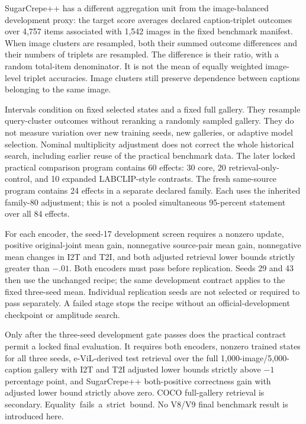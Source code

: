 \documentclass[11pt]{article}
\begin{document}
SugarCrepe++ has a different aggregation unit from the image-balanced
development proxy: the target score averages declared caption-triplet
outcomes over 4,757 items associated with 1,542 images in the fixed
benchmark manifest. When image clusters are resampled, both their summed outcome
differences and their numbers of triplets are resampled. The difference
is their ratio, with a random total-item denominator. It is not the mean
of equally weighted image-level triplet accuracies. Image clusters still
preserve dependence between captions belonging to the same image.

Intervals condition on fixed selected states and a fixed full gallery.
They resample query-cluster outcomes without reranking a randomly sampled
gallery. They do not measure variation over new training seeds, new
galleries, or adaptive model selection. Nominal multiplicity adjustment
does not correct the whole historical search, including earlier reuse of
the practical benchmark data. The later locked practical comparison
program contains 60 effects: 30 core, 20 retrieval-only-control, and 10
expanded LABCLIP-style contrasts. The fresh same-source program contains
24 effects in a separate declared family. Each uses the inherited
family-80 adjustment; this is not a pooled simultaneous 95-percent
statement over all 84 effects.

For each encoder, the seed-17 development screen requires a nonzero update,
positive original-joint mean gain, nonnegative source-pair mean gain,
nonnegative mean changes in I2T and T2I, and both adjusted retrieval lower
bounds strictly greater than $-.01$. Both encoders must pass before
replication. Seeds 29 and 43 then use the unchanged recipe; the same
development contract applies to the fixed three-seed mean. Individual
replication seeds are not selected or required to pass separately.
A failed stage stops the recipe without an official-development checkpoint
or amplitude search.

Only after the three-seed development gate passes does the practical
contract permit a locked final evaluation. It requires both encoders,
nonzero trained states for all three seeds, e-ViL-derived test retrieval
over the full 1,000-image/5,000-caption gallery with I2T and T2I adjusted
lower bounds strictly above $-1$ percentage point, and SugarCrepe++
both-positive correctness gain with adjusted lower bound strictly above
zero. COCO full-gallery retrieval is secondary.
\mbox{Equality fails a strict bound.} No V8/V9 final benchmark result is
introduced here.
\end{document}
